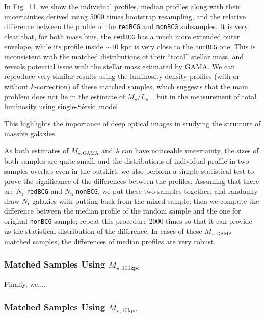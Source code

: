\documentclass[preprint]{aastex}
\def\ser{{S\'{e}rsic\ }}
\def\mtot{{$M_{\star,100\mathrm{kpc}}$}~}
\def\minn{{$M_{\star,10\mathrm{kpc}}$}~}
\def\m2l{{$M_{\star}/L_{\star}$}~}
\begin{document}
\begin{CJK*}{UTF8}{gbsn}
    In Fig.~11, we show the individual profiles, median profiles along with their 
    uncertainties derived using 5000 times bootstrap resampling, and the relative 
    difference between the profile of the \texttt{redBCG} and \texttt{nonBCG} 
    subsamples.  
    It is very clear that, for both mass bins, the \texttt{redBCG} has a much 
    more extended outer envelope, while its profile inside $\sim 10$ kpc is 
    very close to the \texttt{nonBCG} one.  
    This is inconsistent with the matched distributions of their ``total'' 
    stellar mass, and reveals potential issue with the stellar mass estimated 
    by GAMA.
    We can reproduce very similar results using the luminosity density profiles 
    (with or without $k$-correction) of these matched samples, which suggests 
    that the main problem does not lie in the estimate of \m2l, but in the 
    measurement of total luminosity using single-\ser model.  
    
    
    This highlights the importance of deep optical images in studying the 
    structure of massive galaxies. 
    
    As both estimates of $M_{\star, \mathrm{GAMA}}$ and $\lambda$ can have 
    noticeable uncertainty, the sizes of both samples are quite small, and 
    the distributions of individual profile in two samples overlap even in the
    outskirt, we also perform a simple statistical test to prove the significance 
    of the differences between the profiles.  
    Assuming that there are $N_{\mathrm{r}}$ \texttt{redBCG} and 
    $N_{\mathrm{n}}$ \texttt{nonBCG}, we put these two samples together, and 
    randomly draw $N_{\mathrm{r}}$ galaxies with putting-back from the mixed 
    sample; then we compute the difference between the median profile of the
    random sample and the one for original \texttt{nonBCG} sample; repeat this 
    procedure 2000 times so that it can provide us the statistical distribution 
    of the difference. 
    In cases of these $M_{\star, \mathrm{GAMA}}$-matched samples, the differences
    of median profiles are very robust. 
    
\subsubsection{Matched Samples Using \mtot}

    Finally, we....

\subsubsection{Matched Samples Using \minn}


\end{CJK*}
\end{document}
